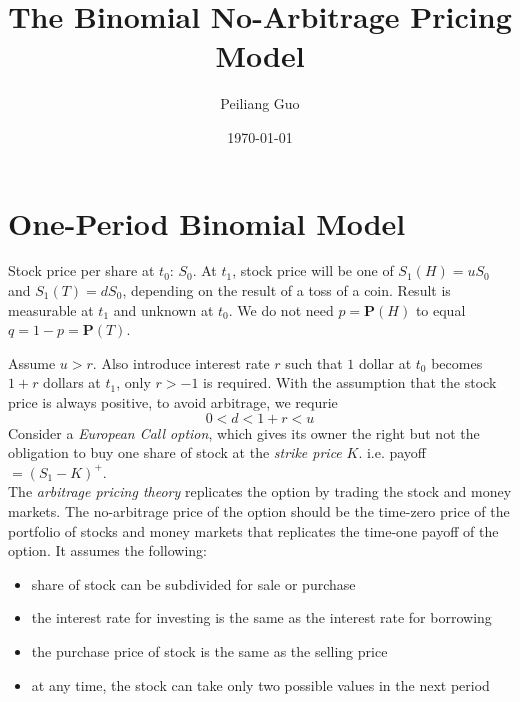 \documentclass[a4paper]{article}
\title{The Binomial No-Arbitrage Pricing Model}
\author{Peiliang Guo}
\date{\today}
\begin{document}
\maketitle

\section{One-Period Binomial Model}
Stock price per share at $t_0$: $S_0$. At $t_1$, stock price will be one of $S_1(H)=uS_0$ and $S_1(T)=dS_0$, depending on the result of a toss of a coin. Result is measurable at $t_1$ and unknown at $t_0$. We do not need $p=\mathbf{P}(H)$ to equal $q=1-p=\mathbf{P}(T)$. 

\begin{center}

  \end{center}
Assume $u>r$. Also introduce interest rate $r$ such that $1$ dollar at $t_0$ becomes $1+r$ dollars at $t_1$, only $r>-1$ is required. With the assumption that the stock price is always positive, to avoid arbitrage, we requrie $$0<d<1+r<u$$  
Consider a \textit{European Call option}, which gives its owner the right but not the obligation to buy one share of stock at the \textit{strike price} $K$. i.e. payoff$=(S_1-K)^+$. \\
The \textit{arbitrage pricing theory} replicates the option by trading the stock and money markets. The no-arbitrage price of the option should be the time-zero price of the portfolio of stocks and money markets that replicates the time-one payoff of the option. It assumes the following:
\begin{itemize}
\item share of stock can be subdivided for sale or purchase
\item the interest rate for investing is the same as the interest rate for borrowing
\item the purchase price of stock is the same as the selling price
\item at any time, the stock can take only two possible values in the next period
\end{itemize}
\end{document}

